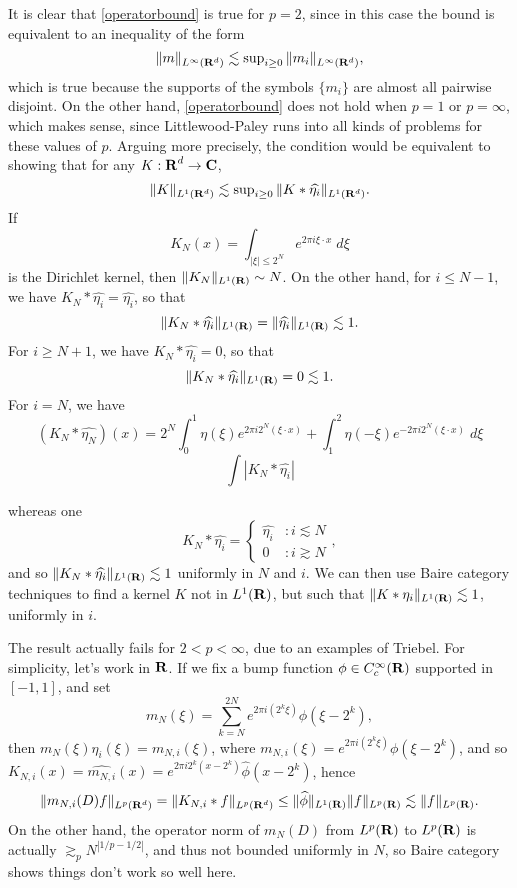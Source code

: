 It is clear that \eqref{operatorbound} is true for $p = 2$, since in this case the bound is equivalent to an inequality of the form
%
\[ \| m \|_{L^\infty(\operatorname{\mathbf{R}}^d)} \lesssim \sup\nolimits_{i \geq 0} \| m_i \|_{L^\infty(\operatorname{\mathbf{R}}^d)}, \]
%
which is true because the supports of the symbols $\{ m_i \}$ are almost all pairwise disjoint. On the other hand, \eqref{operatorbound} does not hold when $p = 1$ or $p = \infty$, which makes sense, since Littlewood-Paley runs into all kinds of problems for these values of $p$. Arguing more precisely, the condition would be equivalent to showing that for any $K: \operatorname{\mathbf{R}}^d \to \operatorname{\mathbf{C}}$,
%
\[ \| K \|_{L^1(\operatorname{\mathbf{R}}^d)} \lesssim \sup\nolimits_{i \geq 0} \| K * \widehat{\eta_i} \|_{L^1(\operatorname{\mathbf{R}}^d)}. \]
%
If
%
\[ K_N(x) = \int_{|\xi| \leq 2^N} e^{2 \pi i \xi \cdot x}\; d\xi \]
%
is the Dirichlet kernel, then $\| K_N \|_{L^1(\operatorname{\mathbf{R}})} \sim N$. On the other hand, for $i \leq N-1$, we have $K_N * \widehat{\eta_i} = \widehat{\eta_i}$, so that
%
\[ \| K_N * \widehat{\eta_i} \|_{L^1(\operatorname{\mathbf{R}})} = \| \widehat{\eta_i} \|_{L^1(\operatorname{\mathbf{R}})} \lesssim 1. \]
%
For $i \geq N+1$, we have $K_N * \widehat{\eta_i} = 0$, so that
%
\[ \| K_N * \widehat{\eta_i} \|_{L^1(\operatorname{\mathbf{R}})} = 0 \lesssim 1. \]
%
For $i = N$, we have
%
\[ (K_N * \widehat{\eta_N})(x) = 2^N \int_0^1 \eta(\xi) e^{2 \pi i 2^N (\xi \cdot x)} + \int_1^2 \eta(-\xi) e^{-2 \pi i 2^N (\xi \cdot x)}\; d\xi  \]
%
\[ \int |K_N * \widehat{\eta_i}| \]

whereas one
% 
%
\[ K_N * \widehat{\eta_i} = \begin{cases} \widehat{\eta_i} &: i \lesssim N \\ 0 &: i \gtrsim N \end{cases}, \]
%
and so $\| K_N * \widehat{\eta_i} \|_{L^1(\operatorname{\mathbf{R}})} \lesssim 1$ uniformly in $N$ and $i$. We can then use Baire category techniques to find a kernel $K$ not in $L^1(\operatorname{\mathbf{R}})$, but such that $\| K * \eta_i \|_{L^1(\operatorname{\mathbf{R}})} \lesssim 1$, uniformly in $i$.

The result actually fails for $2 < p < \infty$, due to an examples of Triebel. For simplicity, let's work in $\operatorname{\mathbf{R}}$. If we fix a bump function $\phi \in C_c^\infty(\operatorname{\mathbf{R}})$ supported in $[-1,1]$, and set
%
\[ m_N(\xi) = \sum_{k = N}^{2N} e^{2 \pi i (2^k \xi)} \phi(\xi - 2^k), \]
%
then $m_N(\xi) \eta_i(\xi) = m_{N,i}(\xi)$, where $m_{N,i}(\xi) = e^{2 \pi i (2^k \xi)} \phi(\xi - 2^k)$, and so $K_{N,i}(x) = \widehat{m_{N,i}}(x) = e^{2 \pi i 2^k(x - 2^k)} \widehat{\phi}(x - 2^k)$, hence
%
\[ \| m_{N,i}(D) f \|_{L^p(\operatorname{\mathbf{R}}^d)} = \| K_{N,i} * f \|_{L^p(\operatorname{\mathbf{R}}^d)} \leq \| \widehat{\phi} \|_{L^1(\operatorname{\mathbf{R}})} \| f \|_{L^p(\operatorname{\mathbf{R}})} \lesssim \| f \|_{L^p(\operatorname{\mathbf{R}})}. \]
%
On the other hand, the operator norm of $m_N(D)$ from $L^p(\operatorname{\mathbf{R}})$ to $L^p(\operatorname{\mathbf{R}})$ is actually $\gtrsim_p N^{|1/p - 1/2|}$, and thus not bounded uniformly in $N$, so Baire category shows things don't work so well here.

